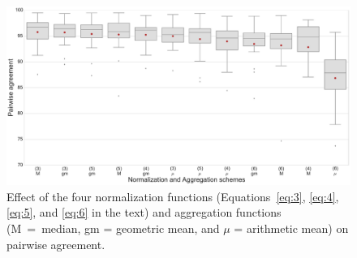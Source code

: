 \begin{figure}[tp]
  \centering
  \includegraphics[width=\linewidth]{figs/aaaa/fig_box_mean.pdf}
  \caption{Effect of the four normalization functions
    (Equations~\eqref{eq:3}, \eqref{eq:4}, \eqref{eq:5}, and \eqref{eq:6}  in
    the text) and aggregation functions (\textsf{M}~=~median, \textsf{gm} = geometric mean, and
    $\mu$ = arithmetic mean) on pairwise agreement. 
  \label{fig:normaggagain}}
\end{figure}


